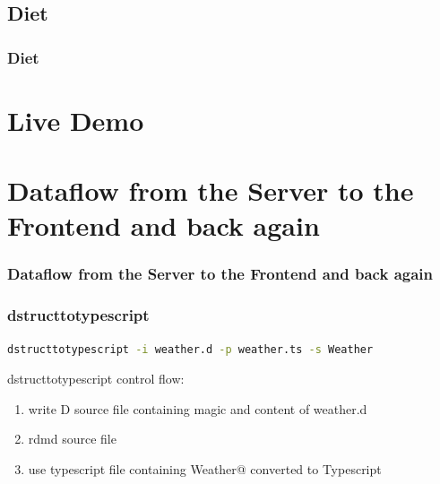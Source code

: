 \documentclass[xelatex,13pt]{beamer}
\begin{document}
\subsection{Diet}
\begin{frame}
	\frametitle{Diet}
	
	\pause
	
	\pause
	
\end{frame}

\section{Live Demo}

\section{Dataflow from the Server to the Frontend and back again}
\begin{frame}
	\frametitle{Dataflow from the Server to the Frontend and back again}
	
	\pause
	
\end{frame}

\begin{frame}[fragile]
	\frametitle{dstructtotypescript}
\begin{lstlisting}[numbers=none,language=bash]
dstructtotypescript -i weather.d -p weather.ts -s Weather
\end{lstlisting}
\pause
dstructtotypescript control flow:
\begin{enumerate}
	\item write D source file containing magic and content of weather.d	
	\item rdmd source file
	\item use typescript file containing \lstinline@struct Weather@ converted
		to Typescript
\end{enumerate}
\end{frame}
\end{document}
